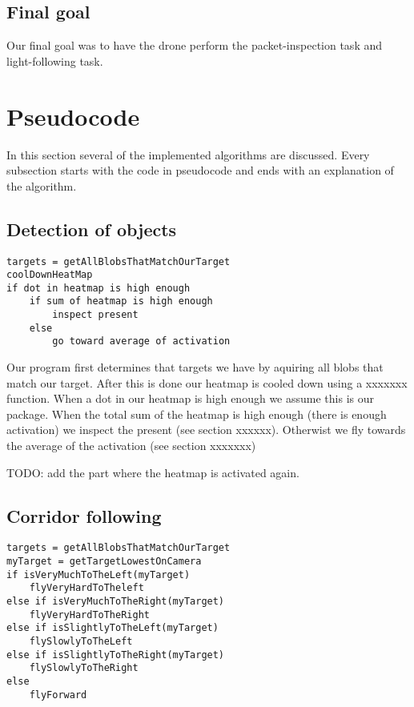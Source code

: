 \documentclass[a4paper,10pt]{article}
\begin{document}
\subsection{Final goal}
Our final goal was to have the drone perform the packet-inspection task and
light-following task.



\section{Pseudocode}
In this section several of the implemented algorithms are discussed. Every subsection starts with the code in pseudocode and ends with an explanation of the algorithm. 
\subsection{Detection of objects}
\begin{verbatim}
targets = getAllBlobsThatMatchOurTarget
coolDownHeatMap
if dot in heatmap is high enough
	if sum of heatmap is high enough
		inspect present
	else
		go toward average of activation

\end{verbatim}
Our program first determines that targets we have by aquiring all blobs that match our target. 
After this is done our heatmap is cooled down using a xxxxxxx function. 
When a dot in our heatmap is high enough we assume this is our package. 
When the total sum of the heatmap is high enough (there is enough activation) we inspect the present (see section xxxxxx). 
Otherwist we fly towards the average of the activation (see section xxxxxxx)


TODO: add the part where the heatmap is activated again. 
\subsection{Corridor following} 
\begin{verbatim}
targets = getAllBlobsThatMatchOurTarget
myTarget = getTargetLowestOnCamera
if isVeryMuchToTheLeft(myTarget)
	flyVeryHardToTheleft
else if isVeryMuchToTheRight(myTarget)
	flyVeryHardToTheRight
else if isSlightlyToTheLeft(myTarget)
	flySlowlyToTheLeft
else if isSlightlyToTheRight(myTarget)
	flySlowlyToTheRight
else
	flyForward

\end{verbatim}
\end{document}
